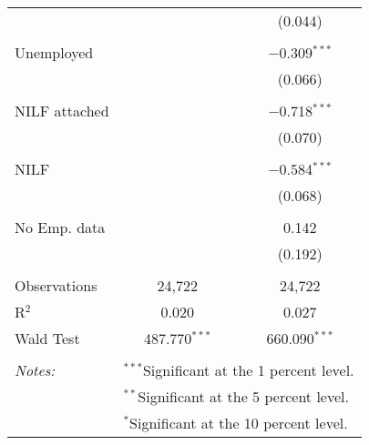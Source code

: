 \begin{table}[!htbp]
\begin{tabular}{@{\extracolsep{1pt}}lcc}
  &  & (0.044) \\ 
  & & \\ 
 Unemployed &  & $-$0.309$^{***}$ \\ 
  &  & (0.066) \\ 
  & & \\ 
 NILF attached &  & $-$0.718$^{***}$ \\ 
  &  & (0.070) \\ 
  & & \\ 
 NILF &  & $-$0.584$^{***}$ \\ 
  &  & (0.068) \\ 
  & & \\ 
 No Emp. data &  & 0.142 \\ 
  &  & (0.192) \\ 
  & & \\ 
Observations & 24,722 & 24,722 \\ 
R$^{2}$ & 0.020 & 0.027 \\ 
Wald Test & 487.770$^{***}$ & 660.090$^{***}$ \\ 
\hline \\[-1.8ex] 
\textit{Notes:} & \multicolumn{2}{l}{$^{***}$Significant at the 1 percent level.} \\ 
 & \multicolumn{2}{l}{$^{**}$Significant at the 5 percent level.} \\ 
 & \multicolumn{2}{l}{$^{*}$Significant at the 10 percent level.} \\ 
\end{tabular} 
\end{table} 
